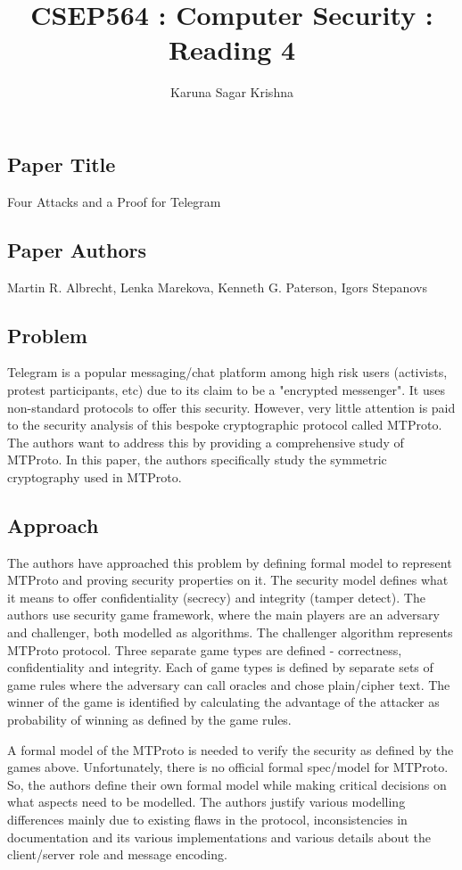 \documentclass[12pt]{article}
\title{CSEP564 : Computer Security : Reading 4}
\author{Karuna Sagar Krishna}
\begin{document}
    \maketitle

    \subsection*{Paper Title}
    Four Attacks and a Proof for Telegram

    \subsection*{Paper Authors}
    Martin R. Albrecht, Lenka Marekova, Kenneth G. Paterson, Igors Stepanovs

    \subsection*{Problem}
    Telegram is a popular messaging/chat platform among high risk users (activists, protest participants, etc) due to its claim to be a "encrypted messenger". It uses non-standard protocols to offer this security. However, very little attention is paid to the security analysis of this bespoke cryptographic protocol called MTProto. The authors want to address this by providing a comprehensive study of MTProto. In this paper, the authors specifically study the symmetric cryptography used in MTProto.

    \subsection*{Approach}
    The authors have approached this problem by defining formal model to represent MTProto and proving security properties on it. The security model defines what it means to offer confidentiality (secrecy) and integrity (tamper detect). The authors use security game framework, where the main players are an adversary and challenger, both modelled as algorithms. The challenger algorithm represents MTProto protocol. Three separate game types are defined - correctness, confidentiality and integrity. Each of game types is defined by separate sets of game rules where the adversary can call oracles and chose plain/cipher text. The winner of the game is identified by calculating the advantage of the attacker as probability of winning as defined by the game rules.

    A formal model of the MTProto is needed to verify the security as defined by the games above. Unfortunately, there is no official formal spec/model for MTProto. So, the authors define their own formal model while making critical decisions on what aspects need to be modelled. The authors justify various modelling differences mainly due to existing flaws in the protocol, inconsistencies in documentation and its various implementations and various details about the client/server role and message encoding.
\end{document}
